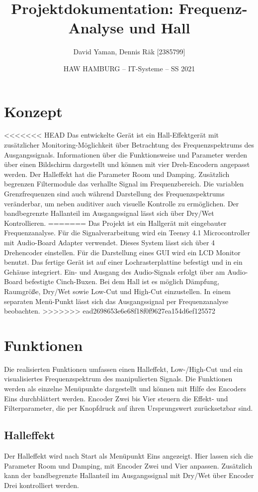 \documentclass[12pt]{article}
\title{Projektdokumentation: Frequenz-Analyse und Hall}        %
\author{David Yaman, Dennis Räk [2385799]}            %
\date{HAW HAMBURG -- IT-Systeme -- SS 2021}                    %
\begin{document}
\maketitle
\newpage
\tableofcontents
\newpage
\section{Konzept}
<<<<<<< HEAD
Das entwickelte Gerät ist ein Hall-Effektgerät mit zusätzlicher Monitoring-Möglichkeit über Betrachtung des Frequenzspektrums des Ausgangssignals. 
Informationen über die Funktionsweise und Parameter werden über einen Bildschirm dargestellt und können mit vier Dreh-Encodern angepasst werden. 
Der Halleffekt hat die Parameter Room und Damping. Zusätzlich begrenzen Filtermodule das verhallte Signal im Frequenzbereich. 
Die variablen Grenzfrequenzen sind auch während Darstellung des Frequenzspektrums veränderbar, um neben auditiver auch visuelle Kontrolle zu ermöglichen. 
Der bandbegrenzte Hallanteil im Ausgangssignal lässt sich über Dry/Wet Kontrollieren.
=======
Das Projekt ist ein Hallgerät mit eingebauter Frequenzanalyse. Für die Signalverarbeitung wird ein 
Teensy 4.1 Microcontroller mit Audio-Board Adapter verwendet. Dieses System lässt sich über 4 Drehencoder einstellen.
Für die Darstellung eines GUI wird ein LCD Monitor benutzt. Das fertige Gerät ist auf einer Lochrasterplattine befestigt und in 
ein Gehäuse integriert. Ein- und Ausgang des Audio-Signals erfolgt über am Audio-Board befestigte Cinch-Buxen. Bei dem Hall ist es möglich
Dämpfung, Raumgröße, Dry/Wet sowie Low-Cut und High-Cut einzustellen. In einem separaten Menü-Punkt lässt sich das Ausgangssignal per Frequenzanalyse beobachten.
>>>>>>> ead2698653e6e68f18f0f9627ea154d6ef125572
\section{Funktionen}
Die realisierten Funktionen umfassen einen Halleffekt, Low-/High-Cut und ein visualisiertes Frequenzspektrum des manipulierten Signals. 
Die Funktionen werden als einzelne Menüpunkte dargestellt und können mit Hilfe des Encoders Eins durchblättert werden. 
Encoder Zwei bis Vier steuern die Effekt- und Filterparameter, die per Knopfdruck auf ihren Ursprungswert zurücksetzbar sind.
\subsection{Halleffekt}
Der Halleffekt wird nach Start als Menüpunkt Eins angezeigt. 
Hier lassen sich die Parameter Room und Damping, mit Encoder Zwei und Vier anpassen. 
Zusätzlich kann der bandbegrenzte Hallanteil im Ausgangssignal mit Dry/Wet über Encoder Drei kontrolliert werden.
\end{document}
